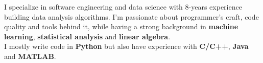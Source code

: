 \begin{cventries}
    \begin{flushleft}
        \bodyfont
        I specialize in software engineering and data science with 8-years
        experience building data analysis algorithms.
        I'm passionate about programmer's craft, code quality and tools behind it, while having
        a strong background in \textbf{machine learning}, \textbf{statistical analysis} and \textbf{linear algebra}.\\
        I mostly write code in \textbf{Python} but also have experience with \textbf{C/C++}, \textbf{Java} and \textbf{MATLAB}.
    \end{flushleft}
\end{cventries}
